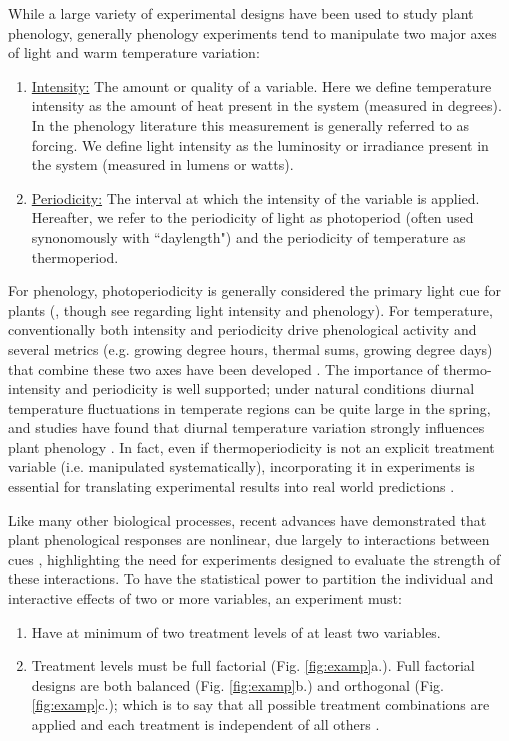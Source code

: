 \documentclass[11pt]{article}
\begin{document}
While a large variety of experimental designs have been used to study plant phenology, generally phenology experiments tend to manipulate two major axes of light and warm temperature variation:
\begin{enumerate}
\item \underline{Intensity:} The amount or quality of a variable. Here we define temperature intensity as the amount of heat present in the system (measured in degrees). In the phenology literature this measurement is generally referred to as forcing. We define light intensity as the luminosity or irradiance present in the system (measured in lumens or watts). 
\item \underline{Periodicity:} The interval at which the intensity of the variable is applied. Hereafter, we refer to the periodicity of light as photoperiod (often used synonomously with ``daylength") and the periodicity of temperature as thermoperiod. 
\end{enumerate}
For phenology, photoperiodicity is generally considered the primary light cue for plants (\citep{WAY:2015aa}, though see \citep{Brelsford2018,Cober1996} regarding light intensity and phenology). For temperature, conventionally both intensity and periodicity drive phenological activity and several metrics (e.g. growing degree hours, thermal sums, growing degree days)  that combine these two axes have been developed \citep{Gu:2016wa}. The importance of thermo-intensity and periodicity is well supported; under natural conditions diurnal temperature fluctuations in temperate regions can be quite large in the spring, and studies have found that diurnal temperature variation strongly influences plant phenology \citep{Burghardt:2016uy}. In fact, even if thermoperiodicity is not an explicit treatment variable (i.e. manipulated systematically), incorporating it in experiments is essential for translating experimental results into real world predictions \citep{plants9101312}.

Like many other biological processes, recent advances have demonstrated that plant phenological responses are nonlinear, due largely to interactions between cues \citep{limitingcues,fu2015}, highlighting the need for experiments designed to evaluate the strength of these interactions. To have the statistical power to partition the individual and interactive effects of two or more variables, an experiment must:
\begin{enumerate}
\item Have at minimum of two treatment levels of at least two variables.
\item Treatment levels must be full factorial (Fig. \ref{fig:examp}a.). Full factorial designs are both balanced (Fig. \ref{fig:examp}b.)  and orthogonal (Fig. \ref{fig:examp}c.); which is to say that all possible treatment combinations are applied and each treatment is independent of all others \citep{cheng2016}.
\end{enumerate}
\end{document}
